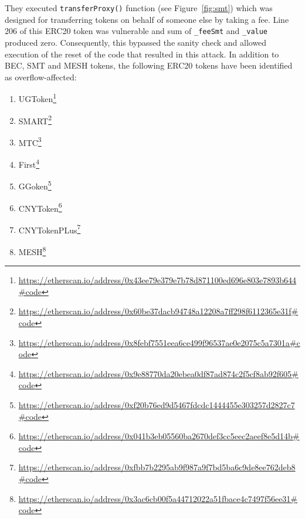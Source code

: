 They executed  \texttt{transferProxy()} function (see Figure~\ref{fig:smt}) which was designed for transferring tokens on behalf of someone else by taking a fee. Line 206 of this ERC20 token was vulnerable and sum of \texttt{\_feeSmt} and \texttt{\_value} produced zero. Consequently, this bypassed the sanity check and allowed execution of the reset of the code that resulted in this attack. In addition to BEC, SMT and MESH tokens, the following ERC20 tokens have been identified as overflow-affected\cite{PeckShield02}:

\begin{enumerate}
	\item UGToken\footnote{\url{https://etherscan.io/address/0x43ee79e379e7b78d871100ed696e803e7893b644\#code}}
	\item SMART\footnote{\url{https://etherscan.io/address/0x60be37dacb94748a12208a7ff298f6112365e31f\#code}}
	\item MTC\footnote{\url{https://etherscan.io/address/0x8febf7551eea6ce499f96537ae0e2075c5a7301a\#code}}
	\item First\footnote{\url{https://etherscan.io/address/0x9e88770da20ebea0df87ad874c2f5cf8ab92f605\#code}}
	\item GGoken\footnote{\url{https://etherscan.io/address/0xf20b76ed9d5467fdcdc1444455e303257d2827c7\#code}}
	\item CNYToken\footnote{\url{https://etherscan.io/address/0x041b3eb05560ba2670def3cc5eec2aeef8e5d14b\#code}}
	\item CNYTokenPLus\footnote{\url{https://etherscan.io/address/0xfbb7b2295ab9f987a9f7bd5ba6c9de8ee762deb8\#code}}
	\item MESH\footnote{\url{https://etherscan.io/address/0x3ac6cb00f5a44712022a51fbace4c7497f56ee31\#code}}
\end{enumerate}


